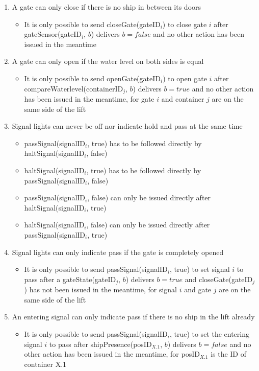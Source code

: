 \begin{enumerate}
	\item A gate can only close if there is no ship in between its doors
	\begin{itemize}
		\item It is only possible to send closeGate(gateID$_i$) to close gate $i$ after gateSensor(gateID$_i$, $b$) delivers $b = false$ and no other action has been issued in the meantime
	\end{itemize}
	
	\item A gate can only open if the water level on both sides is equal
	\begin{itemize}
		\item It is only possible to send openGate(gateID$_i$) to open gate $i$ after compareWaterlevel(containerID$_j$, $b$) delivers $b = true$ and no other action has been issued in the meantime, for gate $i$ and container $j$ are on the same side of the lift
	\end{itemize}
	
	\item Signal lights can never be off nor indicate hold and pass at the same time
		\begin{itemize}
			\item passSignal(signalID$_i$, true) has to be followed directly by \linebreak haltSignal(signalID$_i$, false)
			\item haltSignal(signalID$_i$, true) has to be followed directly by \linebreak passSignal(signalID$_i$, false)
			\item passSignal(signalID$_i$, false) can only be issued directly after \linebreak haltSignal(signalID$_i$, true)
			\item haltSignal(signalID$_i$, false) can only be issued directly after \linebreak passSignal(signalID$_i$, true)
		\end{itemize}
	\item Signal lights can only indicate pass if the gate is completely opened
		\begin{itemize}
			\item It is only possible to send passSignal(signalID$_i$, true) to set signal $i$ to pass after a gateState(gateID$_j$, $ b $) delivers $b = true$ and closeGate(gateID$_j$) has not been issued in the meantime, for signal $i$ and gate $j$ are on the same side of the lift
		\end{itemize}
	\item An entering signal can only indicate pass if there is no ship in the lift already
		\begin{itemize}
			\item It is only possible to send passSignal(signalID$_i$, true) to set the entering signal $i$ to pass after shipPresence(posID$_{X.1}$, $b$) delivers $b = false$ and no other action has been issued in the meantime, for posID$_{X.1}$ is the ID of container X.1
		\end{itemize}
\end{enumerate}

